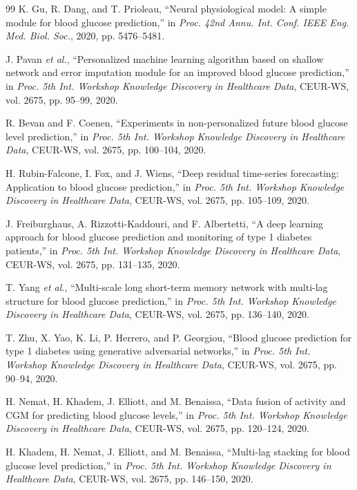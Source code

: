 \documentclass[journal]{IEEEtran}
\begin{document}
\begin{thebibliography}{99}
\label{ref59label} K. Gu, R. Dang, and T. Prioleau, ``Neural physiological model: A simple module for blood glucose prediction,'' in \emph{Proc. 42nd Annu. Int. Conf. IEEE Eng. Med. Biol. Soc.}, 2020, pp. 5476--5481.

\label{ref60label} J. Pavan \emph{et al.}, ``Personalized machine learning algorithm based on shallow network and error imputation module for an improved blood glucose prediction,'' in \emph{Proc. 5th Int. Workshop Knowledge Discovery in Healthcare Data}, CEUR-WS, vol. 2675, pp. 95--99, 2020.

\label{ref61label} R. Bevan and F. Coenen, ``Experiments in non-personalized future blood glucose level prediction,'' in \emph{Proc. 5th Int. Workshop Knowledge Discovery in Healthcare Data}, CEUR-WS, vol. 2675, pp. 100--104, 2020.

\label{ref62label} H. Rubin-Falcone, I. Fox, and J. Wiens, ``Deep residual time-series forecasting: Application to blood glucose prediction,'' in \emph{Proc. 5th Int. Workshop Knowledge Discovery in Healthcare Data}, CEUR-WS, vol. 2675, pp. 105--109, 2020.

\label{ref63label} J. Freiburghaus, A. Rizzotti-Kaddouri, and F. Albertetti, ``A deep learning approach for blood glucose prediction and monitoring of type 1 diabetes patients,'' in \emph{Proc. 5th Int. Workshop Knowledge Discovery in Healthcare Data}, CEUR-WS, vol. 2675, pp. 131--135, 2020.

\label{ref64label} T. Yang \emph{et al.}, ``Multi-scale long short-term memory network with multi-lag structure for blood glucose prediction,'' in \emph{Proc. 5th Int. Workshop Knowledge Discovery in Healthcare Data}, CEUR-WS, vol. 2675, pp. 136--140, 2020.

\label{ref65label} T. Zhu, X. Yao, K. Li, P. Herrero, and P. Georgiou, ``Blood glucose prediction for type 1 diabetes using generative adversarial networks,'' in \emph{Proc. 5th Int. Workshop Knowledge Discovery in Healthcare Data}, CEUR-WS, vol. 2675, pp. 90--94, 2020.

\label{ref66label} H. Nemat, H. Khadem, J. Elliott, and M. Benaissa, ``Data fusion of activity and CGM for predicting blood glucose levels,'' in \emph{Proc. 5th Int. Workshop Knowledge Discovery in Healthcare Data}, CEUR-WS, vol. 2675, pp. 120--124, 2020.

\label{ref67label} H. Khadem, H. Nemat, J. Elliott, and M. Benaissa, ``Multi-lag stacking for blood glucose level prediction,'' in \emph{Proc. 5th Int. Workshop Knowledge Discovery in Healthcare Data}, CEUR-WS, vol. 2675, pp. 146--150, 2020.


\end{thebibliography}
\end{document}
